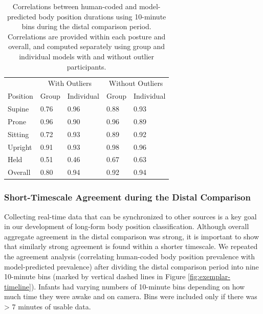 \documentclass[
  man]{apa6}
\begin{document}
\begin{table}[tbp]

\begin{center}
\begin{threeparttable}

\caption{\label{tab:pt2binstable}Correlations between human-coded and model-predicted body position durations using 10-minute bins during the distal comparison period. Correlations are provided within each posture and overall, and computed separately using group and individual models with and without outlier participants.}

\begin{tabular}{lllll}
\toprule
 & \multicolumn{2}{c}{With Outliers} & \multicolumn{2}{c}{Without Outliers} \\
\cmidrule(r){2-3} \cmidrule(r){4-5}
Position & Group & Individual & Group & Individual\\
\midrule
Supine & 0.76 & 0.96 & 0.88 & 0.93\\
Prone & 0.96 & 0.90 & 0.96 & 0.89\\
Sitting & 0.72 & 0.93 & 0.89 & 0.92\\
Upright & 0.91 & 0.93 & 0.98 & 0.96\\
Held & 0.51 & 0.46 & 0.67 & 0.63\\ \midrule
Overall & 0.80 & 0.94 & 0.92 & 0.94\\
\bottomrule
\end{tabular}

\end{threeparttable}
\end{center}

\end{table}

\hypertarget{short-timescale-agreement-during-the-distal-comparison}{%
\subsubsection{Short-Timescale Agreement during the Distal Comparison}\label{short-timescale-agreement-during-the-distal-comparison}}

Collecting real-time data that can be synchronized to other sources is a key goal in our development of long-form body position classification. Although overall aggregate agreement in the distal comparison was strong, it is important to show that similarly strong agreement is found within a shorter timescale. We repeated the agreement analysis (correlating human-coded body position prevalence with model-predicted prevalence) after dividing the distal comparison period into nine 10-minute bins (marked by vertical dashed lines in Figure \ref{fig:exemplar-timeline}). Infants had varying numbers of 10-minute bins depending on how much time they were awake and on camera. Bins were included only if there was \textgreater{} 7 minutes of usable data.
\end{document}
